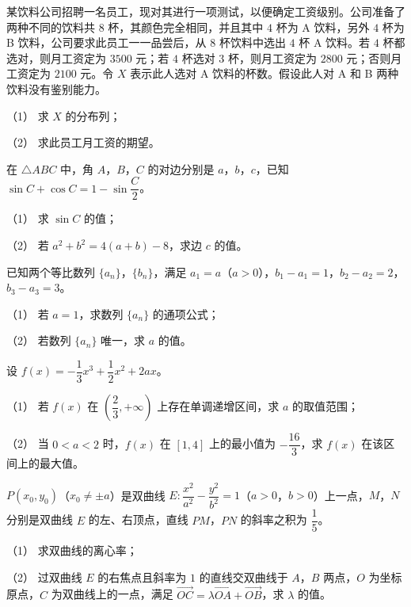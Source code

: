\begin{question}
某饮料公司招聘一名员工，现对其进行一项测试，以便确定工资级别。公司准备了两种不同的饮料共 $8$ 杯，其颜色完全相同，并且其中 $4$ 杯为 A 饮料，另外 $4$ 杯为 B 饮料，公司要求此员工一一品尝后，从 $8$ 杯饮料中选出 $4$ 杯 A 饮料。若 $4$ 杯都选对，则月工资定为 $3500$ 元；若 $4$ 杯选对 $3$ 杯，则月工资定为 $2800$ 元；否则月工资定为 $2100$ 元。令 $X$ 表示此人选对 A 饮料的杯数。假设此人对 A 和 B 两种饮料没有鉴别能力。

（1） 求 $X$ 的分布列；

（2） 求此员工月工资的期望。

\end{question}
\begin{question}
在 $\triangle ABC$ 中，角 $A$，$B$，$C$ 的对边分别是 $a$，$b$，$c$，已知 $\sin C+\cos C=1-\sin\dfrac C2$。

（1） 求 $\sin C$ 的值；

（2） 若 $a^2+b^2=4(a+b)-8$，求边 $c$ 的值。

\end{question}
\begin{question}
已知两个等比数列 $\{a_n\}$，$\{b_n\}$，满足 $a_1=a$（$a>0$），$b_1-a_1=1$，$b_2-a_2=2$，$b_3-a_3=3$。

（1） 若 $a=1$，求数列 $\{a_n\}$ 的通项公式；

（2） 若数列 $\{a_n\}$ 唯一，求 $a$ 的值。

\end{question}
\begin{question}
设 $f(x)=-\dfrac13x^3+\dfrac12x^2+2ax$。

（1） 若 $f(x)$ 在 $\left(\dfrac23,+\infty\right)$ 上存在单调递增区间，求 $a$ 的取值范围；

（2） 当 $0<a<2$ 时，$f(x)$ 在 $[1,4]$ 上的最小值为 $-\dfrac{16}3$，求 $f(x)$ 在该区间上的最大值。

\end{question}
\begin{question}
$P(x_0,y_0)$（$x_0\neq\pm a$）是双曲线 $E:\dfrac{x^2}{a^2}-\dfrac{y^2}{b^2}=1$（$a>0$，$b>0$）上一点，$M$，$N$ 分别是双曲线 $E$ 的左、右顶点，直线 $PM$，$PN$ 的斜率之积为 $\dfrac15$。

（1） 求双曲线的离心率；

（2） 过双曲线 $E$ 的右焦点且斜率为 $1$ 的直线交双曲线于 $A$，$B$ 两点，$O$ 为坐标原点，$C$ 为双曲线上的一点，满足 $\overrightarrow{OC}=\lambda\overrightarrow{OA}+\overrightarrow{OB}$，求 $\lambda$ 的值。

\Needspace{0.4\textheight}
\end{question}
